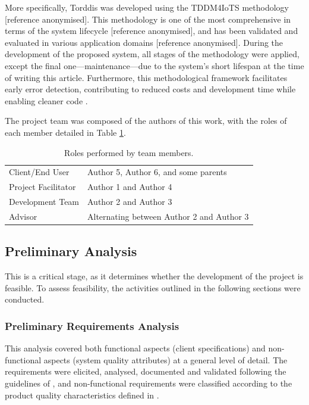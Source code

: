 		More specifically, Torddis was developed using the TDDM4IoTS methodology [reference anonymised]. This methodology is one of the most comprehensive in terms of the system lifecycle [reference anonymised], and has been validated and evaluated in various application domains  [reference anonymised]. During the development of the proposed system, all stages of the methodology were applied, except the final one—maintenance—due to the system’s short lifespan at the time of writing this article. Furthermore, this methodological framework facilitates early error detection, contributing to reduced costs and development time while enabling cleaner code \citep{Beck2002TDD}.
		
		The project team was composed of the authors of this work, with the roles of each member detailed in Table \ref{tab:Roles}.
		
		\begin{table}[!htbp]
			\caption{Roles performed by team members.\label{tab:Roles}}
			\centering
			\begin{tabularx}{0.8\textwidth}{>{\raggedright\arraybackslash}X >{\raggedright\arraybackslash}X}
				\toprule
				\multicolumn{1}{c}{\textbf{Role}} & \multicolumn{1}{c}{\textbf{Member}} \\
				\midrule
				Client/End User & Author 5, Author 6, and some parents\\
				Project Facilitator & Author 1 and Author 4\\
				Development Team & Author 2 and Author 3\\
				Advisor & Alternating between Author 2 and Author 3\\
				\bottomrule
			\end{tabularx}
		\end{table}
		
		\subsection{Preliminary Analysis}
			This is a critical stage, as it determines whether the development of the project is feasible. To assess feasibility, the activities outlined in the following sections were conducted.
			
			\subsubsection{Preliminary Requirements Analysis}
				This analysis covered both functional aspects (client specifications) and non-functional aspects (system quality attributes) at a general level of detail. The requirements were elicited, analysed, documented and validated following the guidelines of \citet{ISO-IEC-IEEE29148-2018}, and non-functional requirements were classified according to the product quality characteristics defined in \citet{ISO-IEC25010-2023}.
				
